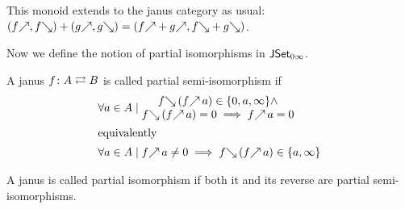 \documentclass[runningheads,envcountsame]{llncs}
\begin{document}
This monoid extends to the janus category as usual: $(\f{f}, \b{f}) + (\f{g}, \b{g}) = (\f{f} + \f{g}, \b{f} + \b{g})$.

Now we define the notion of partial isomorphisms in $\mathsf{J}\mathsf{Set}_{0\infty}$. 

\begin{definition}
A janus $f\colon A \mathrel{{\rightleftarrows}} B$ is called \textnormal{partial semi-isomorphism} if \begin{align}
    \forall a \in A &\mid \begin{matrix}
        \b{f}\,(\f{f}\,a) \in \{0, a, \infty\} \wedge \\
        \b{f}\,(\f{f}\,a) = 0 \implies \f{f}\,a = 0
        \end{matrix} \\
\intertext{equivalently}
    \forall a \in A &\mid \f{f}\,a \neq 0 \implies \b{f}\,(\f{f}\,a) \in \{a, \infty\}
\end{align}

A janus is called \textnormal{partial isomorphism} if both it and its reverse are partial semi-isomorphisms.
\end{definition}
\end{document}
